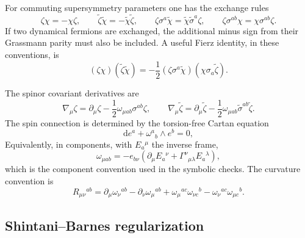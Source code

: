 \documentclass[11pt,a4paper]{article}
\numberwithin{equation}{section}
\theoremstyle{plain}
\theoremstyle{definition}
\theoremstyle{remark}
\newcommand{\dd}{\mathrm{d}}
\begin{document}
For commuting supersymmetry parameters one has the exchange rules
\begin{equation}
\zeta\chi=-\chi\zeta,
\qquad
\widetilde\zeta\widetilde\chi=-\widetilde\chi\widetilde\zeta,
\qquad
\zeta\sigma^a\widetilde\chi=\widetilde\chi\widetilde\sigma^a\zeta,
\qquad
\zeta\sigma^{ab}\chi=\chi\sigma^{ab}\zeta.
\label{eq:app-commuting-spinor-rules}
\end{equation}
If two dynamical fermions are exchanged, the additional minus sign from their Grassmann parity must also be included.  A useful Fierz identity, in these conventions, is
\begin{equation}
(\zeta\chi)(\widetilde\zeta\widetilde\chi)
=-\frac12(\zeta\sigma^a\widetilde\chi)(\chi\sigma_a\widetilde\zeta).
\label{eq:app-Fierz}
\end{equation}

The spinor covariant derivatives are
\begin{equation}
\nabla_\mu\zeta=\partial_\mu\zeta-\frac12\omega_{\mu ab}\sigma^{ab}\zeta,
\qquad
\nabla_\mu\widetilde\zeta=\partial_\mu\widetilde\zeta-\frac12\omega_{\mu ab}\widetilde\sigma^{ab}\widetilde\zeta.
\label{eq:spinor-cov-der}
\end{equation}
The spin connection is determined by the torsion-free Cartan equation
\begin{equation}
\dd e^a+\omega^a{}_{b}\wedge e^b=0,
\label{eq:app-Cartan}
\end{equation}
Equivalently, in components, with \(E_a{}^\mu\) the inverse frame,
\begin{equation}
\omega_{\mu ab}
=-e_{b\nu}\left(\partial_\mu E_a{}^\nu+\Gamma^\nu{}_{\mu\lambda}E_a{}^\lambda\right),
\label{eq:app-spin-connection-component}
\end{equation}
which is the component convention used in the symbolic checks.  The curvature convention is
\begin{equation}
R_{\mu\nu}{}^{ab}
=\partial_\mu\omega_\nu{}^{ab}-\partial_\nu\omega_\mu{}^{ab}
+\omega_\mu{}^{ac}\omega_{\nu c}{}^{b}
-\omega_\nu{}^{ac}\omega_{\mu c}{}^{b}.
\label{eq:app-curvature}
\end{equation}

\subsection{Shintani--Barnes regularization}\label{app:Barnes}
\end{document}
